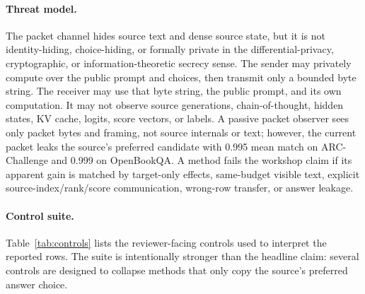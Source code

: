 \documentclass{article}
\newcommand{\arc}{ARC-Challenge}
\newcommand{\obqa}{OpenBookQA}
\begin{document}
\paragraph{Threat model.}
The packet channel hides source text and dense source state, but it is not identity-hiding, choice-hiding, or formally private in the differential-privacy, cryptographic, or information-theoretic secrecy sense. The sender may privately compute over the public prompt and choices, then transmit only a bounded byte string. The receiver may use that byte string, the public prompt, and its own computation. It may not observe source generations, chain-of-thought, hidden states, KV cache, logits, score vectors, or labels. A passive packet observer sees only packet bytes and framing, not source internals or text; however, the current packet leaks the source's preferred candidate with 0.995 mean match on \arc{} and 0.999 on \obqa{}. A method fails the workshop claim if its apparent gain is matched by target-only effects, same-budget visible text, explicit source-index/rank/score communication, wrong-row transfer, or answer leakage.

\paragraph{Control suite.}
Table~\ref{tab:controls} lists the reviewer-facing controls used to interpret the reported rows. The suite is intentionally stronger than the headline claim: several controls are designed to collapse methods that only copy the source's preferred answer choice.
\end{document}
